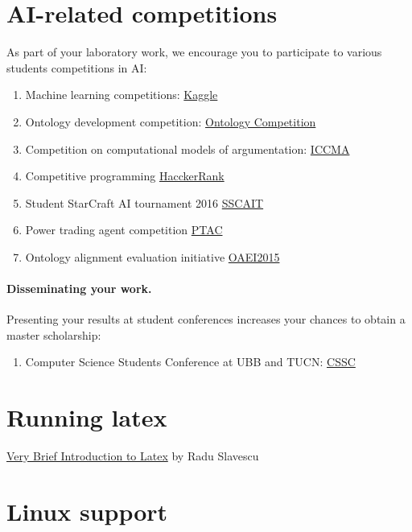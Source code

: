 \documentclass[a4paper,12pt]{report}
\begin{document}
\section{AI-related competitions}
As part of your laboratory work, we encourage you to participate to various students competitions in AI:

\begin{enumerate}
\item Machine learning competitions: \href{https://www.kaggle.com/}{Kaggle}
\item Ontology development competition: \href{http://fois2014.inf.ufes.br/p/call-for-ontology-competition.html}{Ontology Competition}
\item Competition on computational models of argumentation: \href{http://argumentationcompetition.org/}{ICCMA}
\item Competitive programming \href{https://www.hackerrank.com/domains}{HacckerRank}
\item Student StarCraft AI tournament 2016 \href{http://sscaitournament.com/}{SSCAIT}
\item Power trading agent competition \href{http://www.powertac.org/node/39}{PTAC}
\item Ontology alignment evaluation initiative \href{http://oaei.ontologymatching.org/2015/}{OAEI2015}
\end{enumerate}

\paragraph{Disseminating your work.}
 Presenting your results at student conferences increases your chances to obtain a master scholarship:

\begin{enumerate}
 \item Computer Science Students Conference at UBB and TUCN: 
 \href{http://cs.utcluj.ro/csd/site/index.html}{CSSC}
\end{enumerate}


\section{Running latex}

\href{http://cs-gw.utcluj.ro/~srazvan/articleSchema.tgz}{Very Brief Introduction to Latex} by Radu Slavescu

\section{Linux support}
\end{document}
